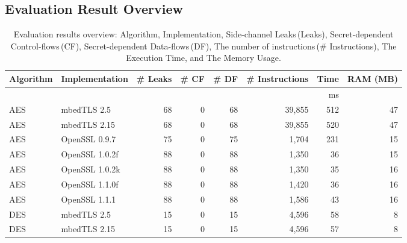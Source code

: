 \subsection{Evaluation Result Overview}
\begin{table}
  \centering\small
  \caption{Evaluation results overview: Algorithm, Implementation, Side-channel Leaks\,(Leaks),
    Secret-dependent Control-flows\,(CF), Secret-dependent Data-flows\,(DF),
    The number of instructions\,(\# Instructions), The Execution Time, and The Memory Usage.
  }\label{table:over_result}
  \begin{tabular}{llrrrrrr}
    \hline
    \textbf{Algorithm} & \textbf{Implementation}  & \textbf{\# Leaks} & \textbf{\# CF}    & \textbf{\# DF}
                       & \textbf{\# Instructions} & \textbf{Time}     & \textbf{RAM (MB)}                                                  \\\hline
                       &                          &                   &                   &                &             & ms              \\\cline{7-7}
    AES                & mbedTLS 2.5              & 68                & 0                 & 68             & 39,855      & 512     & 47    \\
    AES                & mbedTLS 2.15             & 68                & 0                 & 68             & 39,855      & 520     & 47    \\
    AES                & OpenSSL 0.9.7            & 75                & 0                 & 75             & 1,704       & 231     & 15    \\
    AES                & OpenSSL 1.0.2f           & 88                & 0                 & 88             & 1,350       & 36      & 15    \\
    AES                & OpenSSL 1.0.2k           & 88                & 0                 & 88             & 1,350       & 35      & 16    \\
    AES                & OpenSSL 1.1.0f           & 88                & 0                 & 88             & 1,420       & 36      & 16    \\
    AES                & OpenSSL 1.1.1            & 88                & 0                 & 88             & 1,586       & 43      & 16    \\
    DES                & mbedTLS 2.5              & 15                & 0                 & 15             & 4,596       & 58      & 8     \\
    DES                & mbedTLS 2.15             & 15                & 0                 & 15             & 4,596       & 57      & 8     \\

\end{tabular}
\end{table}
